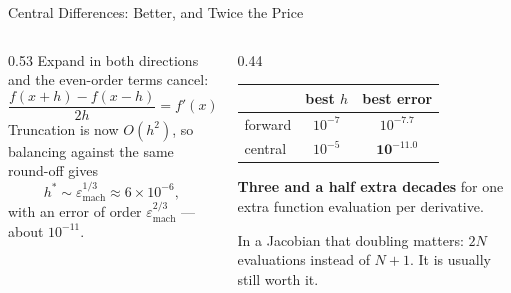 \begin{frame}{Central Differences: Better, and Twice the Price}
\begin{columns}[T]
\begin{column}{0.53\textwidth}
\small
Expand in both directions and the even-order terms cancel:
\[
  \frac{f(x+h)-f(x-h)}{2h}=f'(x)+\tfrac{h^{2}}{6}f'''(x)+O(h^{4}).
\]
Truncation is now $O(h^{2})$, so balancing against the same round-off gives
\[
  h^{*}\sim\varepsilon_{\text{mach}}^{1/3}\approx6\times10^{-6},
\]
with an error of order $\varepsilon_{\text{mach}}^{2/3}$ --- about $10^{-11}$.
\end{column}
\begin{column}{0.44\textwidth}
\begin{center}\footnotesize
\begin{tabularx}{\linewidth}{@{}>{\raggedright\arraybackslash}X c c@{}}
\toprule
 & \textbf{best $h$} & \textbf{best error} \\
\midrule
forward & $10^{-7}$ & $10^{-7.7}$ \\
central & $10^{-5}$ & $\mathbf{10^{-11.0}}$ \\
\bottomrule
\end{tabularx}
\end{center}
\vspace{1mm}
\begin{takeawaybox}\footnotesize
\textbf{Three and a half extra decades} for one extra function evaluation per derivative.
\end{takeawaybox}
\medskip
\begin{cautionbox}\footnotesize
In a Jacobian that doubling matters: $2N$ evaluations instead of $N+1$. It is usually still worth it.
\end{cautionbox}
\end{column}
\end{columns}
\end{frame}

